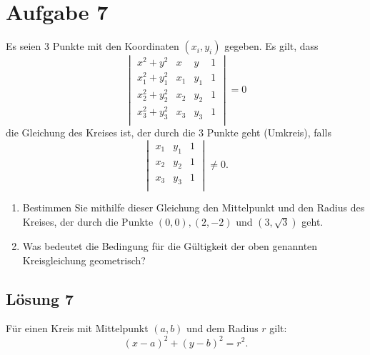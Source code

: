 \documentclass[main.tex]{subfiles}
\begin{document}
\section{Aufgabe 7}
Es seien 3 Punkte mit den Koordinaten $(x_i, y_i)$ gegeben. Es gilt, dass
$$
    \begin{vmatrix}
          x^2 + y^2   & x   & y   & 1 \\
        x_1^2 + y_1^2 & x_1 & y_1 & 1 \\
        x_2^2 + y_2^2 & x_2 & y_2 & 1 \\
        x_3^2 + y_3^2 & x_3 & y_3 & 1 \\
    \end{vmatrix} = 0
$$
die Gleichung des Kreises ist, der durch die 3 Punkte geht (Umkreis), falls
$$
    \begin{vmatrix}
        x_1 & y_1 & 1 \\
        x_2 & y_2 & 1 \\
        x_3 & y_3 & 1 \\
    \end{vmatrix} \neq 0.
$$

\begin{enumerate}
    \item Bestimmen Sie mithilfe dieser Gleichung den Mittelpunkt und den Radius des Kreises, der durch die Punkte $(0, 0), (2, -2)$ und $(3, \sqrt{3})$ geht.
    \item Was bedeutet die Bedingung für die Gültigkeit der oben genannten Kreisgleichung geometrisch?
\end{enumerate}

\subsection{Lösung 7}
Für einen Kreis mit Mittelpunkt $(a, b)$ und dem Radius $r$ gilt:
$$
    (x-a)^2 + (y-b)^2 = r^2.
$$
\end{document}
